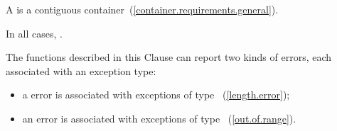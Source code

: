 \pnum
A  is a contiguous container~(\ref{container.requirements.general}).

\pnum
In all cases,
.

\pnum
The functions described in this Clause can report two
kinds of errors, each associated with an exception type:

\begin{itemize}
\item
a
error is associated with exceptions of type
~(\ref{length.error});
%
\item
an
error is associated with exceptions of type
~(\ref{out.of.range}).
%
\end{itemize}

